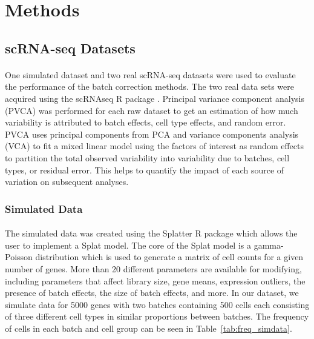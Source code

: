\documentclass[
12pt, %
letterpaper, %
oneside, %
headinclude,footinclude, %
BCOR5mm, %
]{scrartcl}
\begin{document}

\section{Methods}

\subsection{scRNA-seq Datasets}

\paragraph*{}
One simulated dataset and two real scRNA-seq datasets were used to evaluate the performance of the batch correction methods. The two real data sets were acquired using the scRNAseq R package \citep{risso2022scRNAseq}. Principal variance component analysis (PVCA) \citep{li2009principal} was performed for each raw dataset to get an estimation of how much variability is attributed to batch effects, cell type effects, and random error. PVCA uses principal components from PCA and variance components analysis (VCA) to fit a mixed linear model using the factors of interest as random effects to partition the total observed variability into variability due to batches, cell types, or residual error. This helps to quantify the impact of each source of variation on subsequent analyses.

\subsubsection*{Simulated Data}

\paragraph*{}
The simulated data was created using the Splatter R package \citep{zappia2017splatter} which allows the user to implement a Splat model. The core of the Splat model is a gamma-Poisson distribution which is used to generate a matrix of cell counts for a given number of genes. More than 20 different parameters are available for modifying, including parameters that affect library size, gene means, expression outliers, the presence of batch effects, the size of batch effects, and more. In our dataset, we simulate data for 5000 genes with two batches containing 500 cells each consisting of three different cell types in similar proportions between batches. The frequency of cells in each batch and cell group can be seen in Table~\ref{tab:freq_simdata}.
\end{document}
